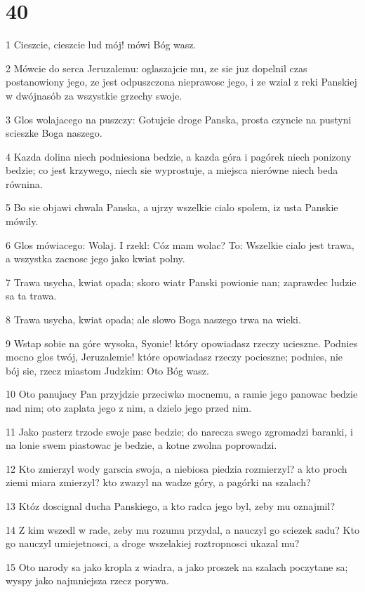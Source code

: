 \chapter{40}

\par 1 Cieszcie, cieszcie lud mój! mówi Bóg wasz.
\par 2 Mówcie do serca Jeruzalemu: oglaszajcie mu, ze sie juz dopelnil czas postanowiony jego, ze jest odpuszczona nieprawosc jego, i ze wzial z reki Panskiej w dwójnasób za wszystkie grzechy swoje.
\par 3 Glos wolajacego na puszczy: Gotujcie droge Panska, prosta czyncie na pustyni scieszke Boga naszego.
\par 4 Kazda dolina niech podniesiona bedzie, a kazda góra i pagórek niech ponizony bedzie; co jest krzywego, niech sie wyprostuje, a miejsca nierówne niech beda równina.
\par 5 Bo sie objawi chwala Panska, a ujrzy wszelkie cialo spolem, iz usta Panskie mówily.
\par 6 Glos mówiacego: Wolaj. I rzekl: Cóz mam wolac? To: Wszelkie cialo jest trawa, a wszystka zacnosc jego jako kwiat polny.
\par 7 Trawa usycha, kwiat opada; skoro wiatr Panski powionie nan; zaprawdec ludzie sa ta trawa.
\par 8 Trawa usycha, kwiat opada; ale slowo Boga naszego trwa na wieki.
\par 9 Wstap sobie na góre wysoka, Syonie! który opowiadasz rzeczy ucieszne. Podnies mocno glos twój, Jeruzalemie! które opowiadasz rzeczy pocieszne; podnies, nie bój sie, rzecz miastom Judzkim: Oto Bóg wasz.
\par 10 Oto panujacy Pan przyjdzie przeciwko mocnemu, a ramie jego panowac bedzie nad nim; oto zaplata jego z nim, a dzielo jego przed nim.
\par 11 Jako pasterz trzode swoje pasc bedzie; do narecza swego zgromadzi baranki, i na lonie swem piastowac je bedzie, a kotne zwolna poprowadzi.
\par 12 Kto zmierzyl wody garscia swoja, a niebiosa piedzia rozmierzyl? a kto proch ziemi miara zmierzyl? kto zwazyl na wadze góry, a pagórki na szalach?
\par 13 Któz doscignal ducha Panskiego, a kto radca jego byl, zeby mu oznajmil?
\par 14 Z kim wszedl w rade, zeby mu rozumu przydal, a nauczyl go sciezek sadu? Kto go nauczyl umiejetnosci, a droge wszelakiej roztropnosci ukazal mu?
\par 15 Oto narody sa jako kropla z wiadra, a jako proszek na szalach poczytane sa; wyspy jako najmniejsza rzecz porywa.
